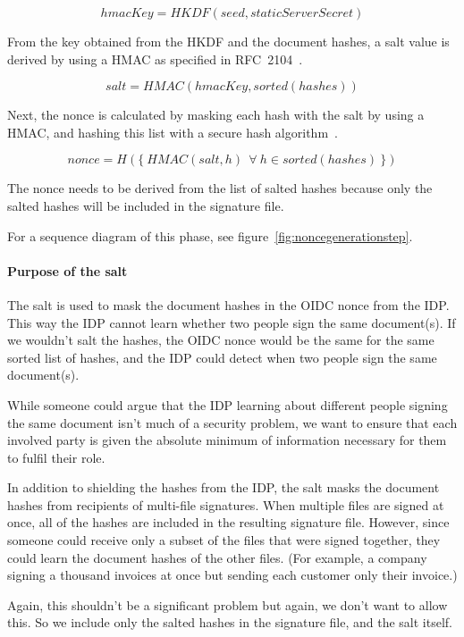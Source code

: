 \[ hmacKey = HKDF(seed, staticServerSecret) \]

From the key obtained from the \gls{HKDF} and the document hashes,
a salt value is derived by using a \gls{HMAC} as specified in RFC~2104~\cite{rfc2104}.

\[ salt = HMAC(hmacKey, sorted(hashes)) \]

Next, the nonce is calculated by masking each hash with the salt by using a \gls{HMAC},
and hashing this list with a secure hash algorithm~\cite{nistsha}.


\[ nonce = H(\{\ HMAC(salt, h) \ \ \forall \ h \in sorted(hashes)\ \}) \]

The nonce needs to be derived from the list of salted hashes because
only the salted hashes will be included in the signature file.

For a sequence diagram of this phase, see figure~\ref{fig:noncegenerationstep}.


\paragraph{Purpose of the salt}
The salt is used to mask the document hashes in the \gls{OIDC} nonce from the \gls{IDP}.
This way the \gls{IDP} cannot learn whether two people sign the same document(s).
If we wouldn't salt the hashes, the \gls{OIDC} nonce would be the same for the same sorted list of hashes,
and the \gls{IDP} could detect when two people sign the same document(s).

While someone could argue that the \gls{IDP} learning about different people signing the same document
isn't much of a security problem, we want to ensure that each involved party is given the absolute minimum
of information necessary for them to fulfil their role.

In addition to shielding the hashes from the \gls{IDP},
the salt masks the document hashes from recipients of multi-file signatures.
When multiple files are signed at once, all of the hashes are included in the resulting signature file.
However, since someone could receive only a subset of the files that were signed together,
they could learn the document hashes of the other files.
(For example, a company signing a thousand invoices at once but sending each customer only their invoice.)

Again, this shouldn't be a significant problem but again, we don't want to allow this.
So we include only the salted hashes in the signature file, and the salt itself.

